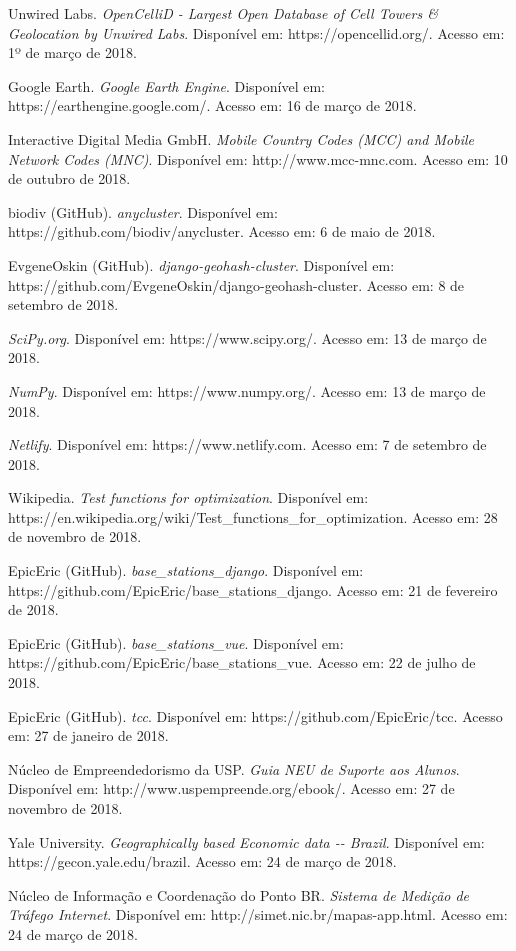 \documentclass[]{politex}
\begin{document}
\begin{thebibliography}{9}
    Unwired Labs.
    \textit{OpenCelliD - Largest Open Database of Cell Towers \&
    Geolocation by Unwired Labs}.
    Disponível em: https://opencellid.org/.
    Acesso em: 1º de março de 2018.

    Google Earth.
    \textit{Google Earth Engine}.
    Disponível em: https://earthengine.google.com/.
    Acesso em: 16 de março de 2018.

    Interactive Digital Media GmbH.
    \textit{Mobile Country Codes (MCC) and Mobile Network Codes (MNC)}.
    Disponível em: http://www.mcc-mnc.com.
    Acesso em: 10 de outubro de 2018.

    biodiv (GitHub).
    \textit{anycluster}.
    Disponível em: https://github.com/biodiv/anycluster.
    Acesso em: 6 de maio de 2018.

    EvgeneOskin (GitHub).
    \textit{django-geohash-cluster}.
    Disponível em: https://github.com/EvgeneOskin/django-geohash-cluster.
    Acesso em: 8 de setembro de 2018.

    \textit{SciPy.org}.
    Disponível em: https://www.scipy.org/.
    Acesso em: 13 de março de 2018.

    \textit{NumPy}.
    Disponível em: https://www.numpy.org/.
    Acesso em: 13 de março de 2018.

    \textit{Netlify}.
    Disponível em: https://www.netlify.com.
    Acesso em: 7 de setembro de 2018.

    Wikipedia.
    \textit{Test functions for optimization}.
    Disponível em: https://en.wikipedia.org/wiki/Test\_functions\_for\_optimization.
    Acesso em: 28 de novembro de 2018.

    EpicEric (GitHub).
    \textit{base\_stations\_django}.
    Disponível em: https://github.com/EpicEric/base\_stations\_django.
    Acesso em: 21 de fevereiro de 2018.

    EpicEric (GitHub).
    \textit{base\_stations\_vue}.
    Disponível em: https://github.com/EpicEric/base\_stations\_vue.
    Acesso em: 22 de julho de 2018.

    EpicEric (GitHub).
    \textit{tcc}.
    Disponível em: https://github.com/EpicEric/tcc.
    Acesso em: 27 de janeiro de 2018.

    Núcleo de Empreendedorismo da USP.
    \textit{Guia NEU de Suporte aos Alunos}.
    Disponível em: http://www.uspempreende.org/ebook/.
    Acesso em: 27 de novembro de 2018.

    Yale University.
    \textit{Geographically based Economic data -{}- Brazil}.
    Disponível em: https://gecon.yale.edu/brazil.
    Acesso em: 24 de março de 2018.

    Núcleo de Informação e Coordenação do Ponto BR.
    \textit{Sistema de Medição de Tráfego Internet}.
    Disponível em: http://simet.nic.br/mapas-app.html.
    Acesso em: 24 de março de 2018.

\end{thebibliography}
\apendice


\anexo
\end{document}
